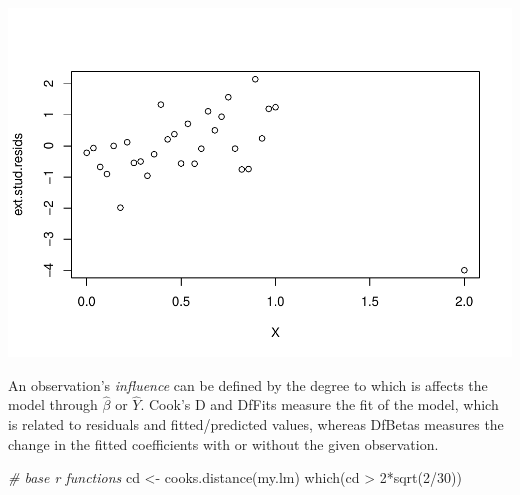 \documentclass[
]{book}
\newenvironment{Shaded}{\begin{snugshade}}{\end{snugshade}}
\newcommand{\CommentTok}[1]{\textcolor[rgb]{0.56,0.35,0.01}{\textit{#1}}}
\newcommand{\ConstantTok}[1]{\textcolor[rgb]{0.00,0.00,0.00}{#1}}
\newcommand{\ControlFlowTok}[1]{\textcolor[rgb]{0.13,0.29,0.53}{\textbf{#1}}}
\newcommand{\DecValTok}[1]{\textcolor[rgb]{0.00,0.00,0.81}{#1}}
\newcommand{\FunctionTok}[1]{\textcolor[rgb]{0.00,0.00,0.00}{#1}}
\newcommand{\NormalTok}[1]{#1}
\newcommand{\OtherTok}[1]{\textcolor[rgb]{0.56,0.35,0.01}{#1}}
\newcommand{\SpecialCharTok}[1]{\textcolor[rgb]{0.00,0.00,0.00}{#1}}
\begin{document}
\begin{Shaded}
\end{Shaded}

\includegraphics{13-MultipleLinearRegression_files/figure-latex/unnamed-chunk-18-3.pdf}

An observation's \emph{influence} can be defined by the degree to which is affects the model through \(\hat\beta\) or \(\hat Y\). Cook's D and DfFits measure the fit of the model, which is related to residuals and fitted/predicted values, whereas DfBetas measures the change in the fitted coefficients with or without the given observation.

\begin{Shaded}
\begin{Highlighting}[]
\CommentTok{\# base r functions}
\NormalTok{cd }\OtherTok{\textless{}{-}} \FunctionTok{cooks.distance}\NormalTok{(my.lm)}
\FunctionTok{which}\NormalTok{(cd }\SpecialCharTok{\textgreater{}} \DecValTok{2}\SpecialCharTok{*}\FunctionTok{sqrt}\NormalTok{(}\DecValTok{2}\SpecialCharTok{/}\DecValTok{30}\NormalTok{))}
\end{Highlighting}
\end{Shaded}
\end{document}
